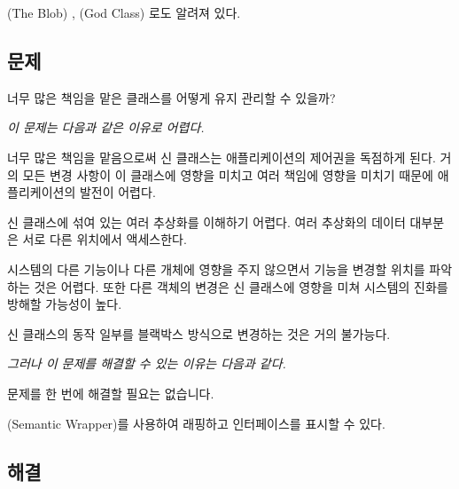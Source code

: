 \documentclass[a4paper,10pt,twoside]{book}
\begin{document}

(The Blob) \cite{Brow98a}, (God Class) \cite{Riel96a}로도 알려져 있다.


\subsection*{문제}

너무 많은 책임을 맡은 클래스를 어떻게 유지 관리할 수 있을까?

\emph{이 문제는 다음과 같은 이유로 어렵다.} 

\begin{bulletlist}
\item 너무 많은 책임을 맡음으로써 신 클래스는 애플리케이션의 제어권을 독점하게 된다. 거의 모든 변경 사항이 이 클래스에 영향을 미치고 여러 책임에 영향을 미치기 때문에 애플리케이션의 발전이 어렵다.

\item 신 클래스에 섞여 있는 여러 추상화를 이해하기 어렵다. 여러 추상화의 데이터 대부분은 서로 다른 위치에서 액세스한다.

\item 시스템의 다른 기능이나 다른 개체에 영향을 주지 않으면서 기능을 변경할 위치를 파악하는 것은 어렵다. 또한 다른 객체의 변경은 신 클래스에 영향을 미쳐 시스템의 진화를 방해할 가능성이 높다. 

\item 신 클래스의 동작 일부를 블랙박스 방식으로 변경하는 것은 거의 불가능다.
\end{bulletlist}

\emph{그러나 이 문제를 해결할 수 있는 이유는 다음과 같다.}

\begin{bulletlist}
\item 문제를 한 번에 해결할 필요는 없습니다.

\item {}(Semantic Wrapper)를 사용하여 래핑하고 인터페이스를 표시할 수 있다.
\end{bulletlist}

\subsection*{해결}
\end{document}
